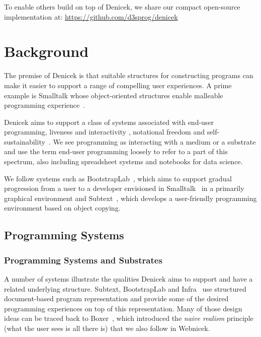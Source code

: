 \documentclass[sigconf]{acmart}
\newcommand{\diff}[1]{{#1}}
\newcommand{\note}[1]{}
\begin{document}
\noindent
To enable others build on top of Denicek, we share our compact open-source
implementation at: \url{https://github.com/d3sprog/denicek}


\section{Background}
\label{sec:background}
\note{Clarify focus to make paper more self-contained}
\diff{The premise of Denicek is that suitable structures for constructing programs can make it easier
to support a range of compelling user experiences. A prime example is
Smalltalk whose object-oriented structures
enable malleable programming experience~\cite{girba-2017-moldable,tcher-2019-malleable}.}

Denicek aims to support a class of systems associated with end-user programming, liveness and
interactivity \cite{myers-2006-eup,horowitz-2023-qualities,rein-2019-live}, notational freedom and
self-sustainability~\cite{jakubovic-2023-techdims}. We see programming as interacting with a medium
or a substrate \cite{kay-1977-media,klokmose-2015-webstrates,rpg-2012-revolution} and
use the term end-user programming loosely to refer to a part of this spectrum, also including
spreadsheet systems and notebooks for data science.

\note{Highlight related systems (discussed later) for better framing}
\diff{We follow systems such as BootstrapLab~\cite{jakubovic-2022-ladder}, which aims to support
gradual progression from a user to a developer envisioned in Smalltalk~\cite{reenskaug-1981-byte}
in a primarily graphical environment and Subtext~\cite{edwards-2005-subtext},
which develops a user-friendly programming environment based on object copying.}


\subsection{Programming Systems}
\label{sec:background-sys}

\subsubsection*{Programming Systems and Substrates}
A number of systems illustrate the qualities Denicek aims to support and have a related underlying
structure. Subtext, BootstrapLab and Infra~\cite{edwards-2005-subtext,jakubovic-2022-ladder,hall-2017-infra}
use structured document-based program representation and provide some of the desired programming
experiences on top of this representation. Many of those design ideas can be traced back to
Boxer~\cite{disessa-1986-boxer}, which introduced the \emph{naive realism} principle (what the user
sees is all there is) that we also follow in Webnicek.
\end{document}

